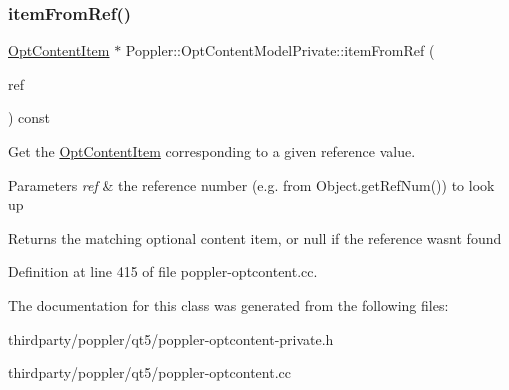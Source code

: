 \subsubsection{\texorpdfstring{item\+From\+Ref()}{itemFromRef()}}
{\footnotesize\ttfamily \hyperlink{class_poppler_1_1_opt_content_item}{Opt\+Content\+Item} $\ast$ Poppler\+::\+Opt\+Content\+Model\+Private\+::item\+From\+Ref (\begin{DoxyParamCaption}\item[{const Q\+String \&}]{ref }\end{DoxyParamCaption}) const}

Get the \hyperlink{class_poppler_1_1_opt_content_item}{Opt\+Content\+Item} corresponding to a given reference value.


\begin{DoxyParams}{Parameters}
{\em ref} & the reference number (e.\+g. from Object.\+get\+Ref\+Num()) to look up\\
\hline
\end{DoxyParams}
\begin{DoxyReturn}{Returns}
the matching optional content item, or null if the reference wasn\textquotesingle{}t found 
\end{DoxyReturn}


Definition at line 415 of file poppler-\/optcontent.\+cc.



The documentation for this class was generated from the following files\+:\begin{DoxyCompactItemize}
\item 
thirdparty/poppler/qt5/poppler-\/optcontent-\/private.\+h\item 
thirdparty/poppler/qt5/poppler-\/optcontent.\+cc\end{DoxyCompactItemize}
